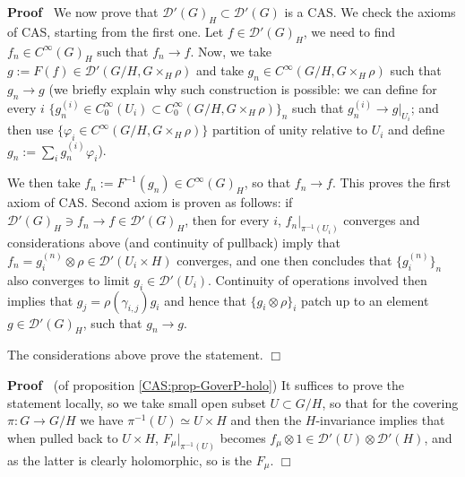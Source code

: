 \documentclass{article}
\newcommand{\assign}{:=}
\newenvironment{proof}{\noindent\textbf{Proof\ }}{\hspace*{\fill}$\Box$\medskip}
\begin{document}
\begin{proof}
  We now prove that $\mathcal{D}' (G)_H \subset \mathcal{D}' (G)$ is a CAS. We
  check the axioms of CAS, starting from the first one. Let $f \in
  \mathcal{D}' (G)_H$, we need to find $f_n \in C^{\infty} (G)_H$ such that
  $f_n \rightarrow f$. Now, we take $g \assign F (f) \in \mathcal{D}' (G / H,
  G \times_H \rho)$ and take $g_n \in C^{\infty} (G / H, G \times_H \rho)$
  such that $g_n \rightarrow g$ (we briefly explain why such construction is
  possible: we can define for every $i$ $\{ g_n^{(i)} \in C^{\infty}_0 (U_i)
  \subset C^{\infty}_0 (G / H, G \times_H \rho) \}_n$ such that $g_n^{(i)}
  \rightarrow g \big|_{U_i}$; and then use $\{ \varphi_i \in C^{\infty} (G
  / H, G \times_H \rho) \}$ partition of unity relative to $U_i$ and define
  $g_n \assign \sum_i g^{(i)_{}}_n \varphi_i$).
  
  We then take $f_n \assign F^{- 1} (g_n) \in C^{\infty} (G)_H$, so that $f_n
  \rightarrow f$. This proves the first axiom of CAS. Second axiom is proven
  as follows: if $\mathcal{D}'  (G)_H \ni f_n \rightarrow f \in \mathcal{D}'
  (G)_H$, then for every $i$, $f_n \big|_{\pi^{- 1} (U_i)}$ converges and
  considerations above (and continuity of pullback) imply that $f_n =
  g_i^{(n)} \otimes \rho \in \mathcal{D}' (U_i \times H)$ converges, and one
  then concludes that $\{ g_i^{(n)} \}_n$ also converges to limit $g_i \in
  \mathcal{D}' (U_i)$. Continuity of operations involved then implies that
  $g_j = \rho (\gamma_{i, j}) g_i$ and hence that $\{ g_i \otimes \rho \}_i$
  patch up to an element $g \in \mathcal{D}' (G)_H$, such that $g_n
  \rightarrow g$.
  
  The considerations above prove the statement.
\end{proof}

\begin{proof}
  (of proposition \ref{CAS:prop-GoverP-holo}) It suffices to prove the
  statement locally, so we take small open subset $U \subset G / H$, so that
  for the covering $\pi : G \rightarrow G / H$ we have $\pi^{- 1} (U) \simeq U
  \times H$ and then the $H$-invariance implies that when pulled back to $U
  \times H$, $F_{\mu} \big|_{\pi^{- 1} (U)}$ becomes $f_{\mu} \otimes 1 \in
  \mathcal{D}' (U) \otimes \mathcal{D}' (H)$, and as the latter is clearly
  holomorphic, so is the $F_{\mu}$.
\end{proof}
\end{document}
